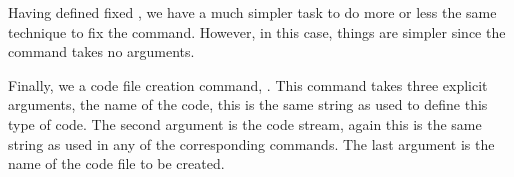 \startMkIVCode
\def\fixStartLitProgs#1{%
  \let\csname oldStart#1\endcsname=\csname start#1\endcsname%
  \unexpanded\def\csname start#1\endcsname{%
    \dosingleempty\csname start#1Direct\endcsname%
  }
  \def\csname start#1Direct\endcsname{%
    \iffirstargument%
      \expandafter\csname start#1Single\endcsname%
    \else
      \expandafter\csname start#1Zero\endcsname%
    \fi
  }
  \def\csname start#1Zero\endcsname{%
    \csname start#1Single\endcsname[default]%
  }
  \def\csname start#1Single\endcsname[#1]{%
    \directlua{thirddata.literateProgs.setCodeStream('#1')}%
    \csname oldStart#1\endcsname%
  }
}
\stopMkIVCode

Having defined fixed \type{\startXXX}, we have a much simpler task to do 
more or less the same technique to fix the \type{\stopXXX} command. 
However, in this case, things are simpler since the \type{\stopXXX} 
command takes no arguments. 

\startMkIVCode
\def\fixStopLitProgs#1{
  \let\csname oldStop#1\endcsname=\csname stop#1\endcsname
  \def\csname stop#1\endcsname{
    \csname oldStop#1\endcsname
    \directlua{
      thirddata.literateProgs.addCode(
        '#1',
        '_typing_'
      )
    }
  }
}
\stopMkIVCode




Finally, we a  code file creation command, 
\type{\createLitProgsFile}. This command takes three explicit arguments, 
the name of the code, this is the same string as used to define this type 
of code. The second argument is the code stream, again this is the same 
string as used in any of the corresponding \type{\startXXX} commands. The 
last argument is the name of the code file to be created. 

\startMkIVCode
\def\createLitProgsFile{%
  \directlua{
    thirddata.literateProgs.createCodeFile(
      \currentLitProgs,
      \somethingElse,
      '#1'
    )
  }
}
\stopMkIVCode

